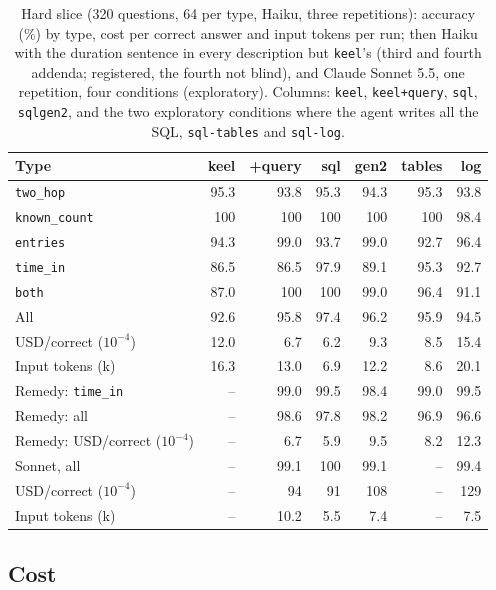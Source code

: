 \documentclass[sigconf, nonacm]{acmart}
\newcommand{\code}[1]{\texttt{#1}}
\begin{document}
\begin{table}[t]
\caption{Hard slice (320 questions, 64 per type, Haiku, three repetitions): accuracy (\%) by type, cost per correct answer and input tokens per run; then Haiku with the duration sentence in every description but \code{keel}'s (third and fourth addenda; registered, the fourth not blind), and Claude Sonnet 5.5, one repetition, four conditions (exploratory). Columns: \code{keel}, \code{keel+query}, \code{sql}, \code{sqlgen2}, and the two exploratory conditions where the agent writes all the SQL, \code{sql-tables} and \code{sql-log}.}
\label{tab:hard}
\centering
\footnotesize
\setlength{\tabcolsep}{3pt}
\begin{tabular}{l r r r r r r}
\toprule
Type & keel & +query & sql & gen2 & tables & log \\
\midrule
\code{two\_hop} & 95.3 & 93.8 & 95.3 & 94.3 & 95.3 & 93.8 \\
\code{known\_count} & 100 & 100 & 100 & 100 & 100 & 98.4 \\
\code{entries} & 94.3 & 99.0 & 93.7 & 99.0 & 92.7 & 96.4 \\
\code{time\_in} & 86.5 & 86.5 & 97.9 & 89.1 & 95.3 & 92.7 \\
\code{both} & 87.0 & 100 & 100 & 99.0 & 96.4 & 91.1 \\
\midrule
All & 92.6 & 95.8 & 97.4 & 96.2 & 95.9 & 94.5 \\
USD/correct ($10^{-4}$) & 12.0 & 6.7 & 6.2 & 9.3 & 8.5 & 15.4 \\
Input tokens (k) & 16.3 & 13.0 & 6.9 & 12.2 & 8.6 & 20.1 \\
\midrule
Remedy: \code{time\_in} & -- & 99.0 & 99.5 & 98.4 & 99.0 & 99.5 \\
Remedy: all & -- & 98.6 & 97.8 & 98.2 & 96.9 & 96.6 \\
Remedy: USD/correct ($10^{-4}$) & -- & 6.7 & 5.9 & 9.5 & 8.2 & 12.3 \\
\midrule
Sonnet, all & -- & 99.1 & 100 & 99.1 & -- & 99.4 \\
USD/correct ($10^{-4}$) & -- & 94 & 91 & 108 & -- & 129 \\
Input tokens (k) & -- & 10.2 & 5.5 & 7.4 & -- & 7.5 \\
\bottomrule
\end{tabular}
\end{table}

\subsection{Cost}
\label{sec:res-cost}
\end{document}
